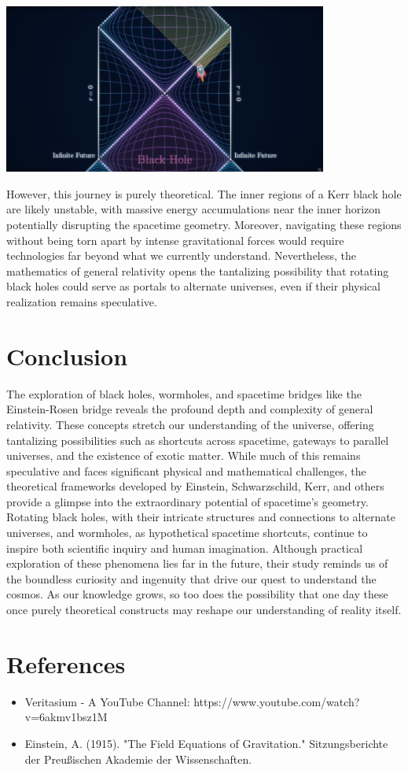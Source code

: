 \documentclass[12pt,a4paper]{article}
\begin{document}
\begin{center}
    \includegraphics[width=0.8\textwidth]{rotating_maps.png}    
\end{center}

However, this journey is purely theoretical. The inner regions of a Kerr black hole are likely unstable, with massive energy accumulations near the inner horizon potentially disrupting the spacetime geometry. Moreover, navigating these regions without being torn apart by intense gravitational forces would require technologies far beyond what we currently understand. Nevertheless, the mathematics of general relativity opens the tantalizing possibility that rotating black holes could serve as portals to alternate universes, even if their physical realization remains speculative.

\section{Conclusion}
The exploration of black holes, wormholes, and spacetime bridges like the Einstein-Rosen bridge reveals the profound depth and complexity of general relativity. These concepts stretch our understanding of the universe, offering tantalizing possibilities such as shortcuts across spacetime, gateways to parallel universes, and the existence of exotic matter. While much of this remains speculative and faces significant physical and mathematical challenges, the theoretical frameworks developed by Einstein, Schwarzschild, Kerr, and others provide a glimpse into the extraordinary potential of spacetime’s geometry. Rotating black holes, with their intricate structures and connections to alternate universes, and wormholes, as hypothetical spacetime shortcuts, continue to inspire both scientific inquiry and human imagination. Although practical exploration of these phenomena lies far in the future, their study reminds us of the boundless curiosity and ingenuity that drive our quest to understand the cosmos. As our knowledge grows, so too does the possibility that one day these once purely theoretical constructs may reshape our understanding of reality itself.

\section{References}
\begin{itemize}
    \item Veritasium - A YouTube Channel: https://www.youtube.com/watch?v=6akmv1bsz1M
    \item Einstein, A. (1915). "The Field Equations of Gravitation." Sitzungsberichte der Preußischen Akademie der Wissenschaften.
\end{itemize}
\end{document}
